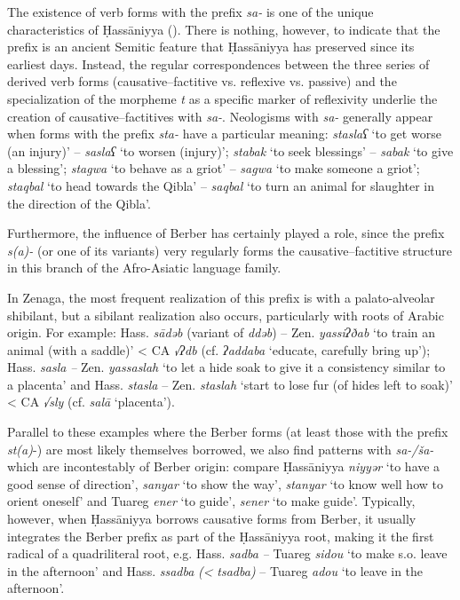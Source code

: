 \documentclass[output=paper]{langsci/langscibook}
\begin{document}
The existence of verb forms with the prefix \textit{sa-} is one of the unique characteristics of Ḥassāniyya (\citealt{Cohen1963,Taine-Cheikh2003}). There is nothing, however, to indicate that the prefix is an ancient Semitic feature that Ḥassāniyya has preserved since its earliest days. Instead, the regular correspondences between the three series of derived verb forms (causative--factitive vs. reflexive vs. passive) and the specialization of the morpheme \textit{t} as a specific marker of reflexivity underlie the creation of causative--factitives with \textit{sa-}. Neologisms with \textit{sa-} generally appear when forms with the prefix \textit{sta-} have a particular meaning: \textit{staslaʕ} ‘to get worse (an injury)’ – \textit{saslaʕ} ‘to worsen (injury)’; \textit{stab{\R}ak} ‘to seek blessings’ – \textit{sab{\R}ak} ‘to give a blessing’; \textit{stagwa} ‘to behave as a griot’ – \textit{sagwa} ‘to make someone a griot’; \textit{staqbal} ‘to head towards the Qibla’ – \textit{saqbal} ‘to turn an animal for slaughter in the direction of the Qibla’. 

Furthermore, the influence of Berber has certainly played a role, since the prefix \textit{s(a)-} (or one of its variants) very regularly forms the causative--factitive structure in this branch of the Afro-Asiatic language family. 

In Zenaga, the most frequent realization of this prefix is with a palato-alveolar shibilant, but a sibilant realization also occurs, particularly with roots of Arabic origin. For example: Hass. \textit{sādəb} (variant of \textit{ddəb}) – Zen. \textit{yassiʔðab} ‘to train an animal (with a saddle)’ < CA \textit{√ʔdb} (cf. \textit{ʔaddaba} ‘educate, carefully bring up’); Hass. \textit{sasla} \textit{–} Zen. \textit{yassaslah} ‘to let a hide soak to give it a consistency similar to a placenta’ and Hass. \textit{stasla} – Zen. \textit{staslah} ‘start to lose fur (of hides left to soak)’ < CA \textit{√sly} (cf. \textit{salā} ‘placenta’).

Parallel to these examples where the Berber forms (at least those with the prefix \textit{st(a)}{}-) are most likely themselves borrowed, we also find patterns with \textit{sa-/ša-} which are incontestably of Berber origin: compare Ḥassāniyya \textit{niyyər} ‘to have a good sense of direction’, \textit{sanyar} ‘to show the way’, \textit{stanyar} ‘to know well how to orient oneself’ and Tuareg \textit{ener} ‘to guide’, \textit{sener} ‘to make guide’. Typically, however, when Ḥassāniyya borrows causative forms from Berber, it usually integrates the Berber prefix as part of the Ḥassāniyya root, making it the first radical of a quadriliteral root, e.g. Hass. \textit{sadba} \textit{–} Tuareg \textit{sidou} ‘to make s.o. leave in the afternoon’ and Hass. \textit{ssadba} \textit{(<} \textit{tsadba)} – Tuareg \textit{adou} ‘to leave in the afternoon’. 
\end{document}

